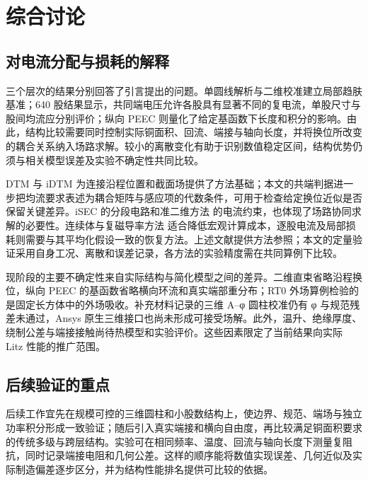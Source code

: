 \section{综合讨论}
\label{chapter:11}

\hypertarget{11.discussion.heading}{}
\subsection{对电流分配与损耗的解释}

\hypertarget{11.discussion.p1}{}
三个层次的结果分别回答了引言提出的问题。单圆线解析与二维校准建立局部趋肤基准；640 股结果显示，共同端电压允许各股具有显著不同的复电流，单股尺寸与股间均流应分别评价；纵向 PEEC 则量化了给定基函数下长度和积分的影响。由此，结构比较需要同时控制实际铜面积、回流、端接与轴向长度，并将换位所改变的耦合关系纳入场路求解。较小的离散变化有助于识别数值稳定区间，结构优势仍须与相关模型误差及实验不确定性共同比较。

\hypertarget{11.discussion.p2}{}
DTM 与 iDTM \cite{P01,N01} 为连接沿程位置和截面场提供了方法基础；本文的共端判据进一步把均流要求表述为耦合矩阵与感应项的代数条件，可用于检查给定换位近似是否保留关键差异。iSEC \cite{P02} 的分段电路和准二维方法 \cite{P04} 的电流约束，也体现了场路协同求解的必要性。连续体与复磁导率方法 \cite{P05,P09} 适合降低宏观计算成本，逐股电流及局部损耗则需要与其平均化假设一致的恢复方法。上述文献提供方法参照；本文的定量验证采用自身工况、离散和误差记录，各方法的实验精度需在共同算例下比较。

\hypertarget{11.discussion.p3}{}
现阶段的主要不确定性来自实际结构与简化模型之间的差异。二维直束省略沿程换位，纵向 PEEC 的基函数省略横向环流和真实端部重分布；RT0 外场算例检验的是固定长方体中的外场吸收。补充材料记录的三维 A–φ 圆柱校准仍有 φ 与规范残差未通过，Ansys 原生三维接口也尚未形成可接受场解。此外，温升、绝缘厚度、绕制公差与端接接触尚待热模型和实验评价。这些因素限定了当前结果向实际 Litz 性能的推广范围。

\hypertarget{11.recommendations.heading}{}
\subsection{后续验证的重点}

\hypertarget{11.recommendations.p1}{}
后续工作宜先在规模可控的三维圆柱和小股数结构上，使边界、规范、端场与独立功率积分形成一致验证；随后引入真实端接和横向自由度，再比较满足铜面积要求的传统多级与跨层结构。实验可在相同频率、温度、回流与轴向长度下测量复阻抗，同时记录端接电阻和几何公差。这样的顺序能将数值实现误差、几何近似及实际制造偏差逐步区分，并为结构性能排名提供可比较的依据。
